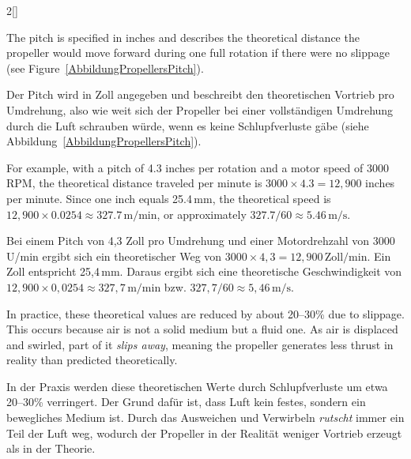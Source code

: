 \begin{paracol}{2}[]
\coleng

The pitch is specified in inches and describes the theoretical distance the propeller would move forward during one full rotation if there were no slippage (see Figure~\ref{AbbildungPropellersPitch}).

\colger

Der Pitch wird in Zoll angegeben und beschreibt den theoretischen Vortrieb pro Umdrehung, also wie weit sich der Propeller bei einer vollständigen Umdrehung durch die Luft schrauben würde, wenn es keine Schlupfverluste gäbe (siehe Abbildung~\ref{AbbildungPropellersPitch}).

\coleng

For example, with a pitch of 4.3 inches per rotation and a motor speed of 3000\,RPM, the theoretical distance traveled per minute is \(3000 \times 4.3 = 12{,}900\) inches per minute. Since one inch equals 25.4\,mm, the theoretical speed is \(12{,}900 \times 0.0254 \approx 327.7\,\text{m/min}\), or approximately \(327.7 / 60 \approx 5.46\,\text{m/s}\).

\colger

Bei einem Pitch von 4,3 Zoll pro Umdrehung und einer Motordrehzahl von 3000\,U/min ergibt sich ein theoretischer Weg von \(3000 \times 4{,}3 = 12{,}900\,\text{Zoll/min}\). Ein Zoll entspricht 25,4\,mm. Daraus ergibt sich eine theoretische Geschwindigkeit von \(12{,}900 \times 0{,}0254 \approx 327{,}7\,\text{m/min}\) bzw. \(327{,}7 / 60 \approx 5{,}46\,\text{m/s}\).

\coleng

In practice, these theoretical values are reduced by about 20--30\% due to slippage. This occurs because air is not a solid medium but a fluid one. As air is displaced and swirled, part of it \textsl{slips away}, meaning the propeller generates less thrust in reality than predicted theoretically.

\colger

In der Praxis werden diese theoretischen Werte durch Schlupfverluste um etwa 20--30\% verringert. Der Grund dafür ist, dass Luft kein festes, sondern ein bewegliches Medium ist. Durch das Ausweichen und Verwirbeln \textsl{rutscht} immer ein Teil der Luft weg, wodurch der Propeller in der Realität weniger Vortrieb erzeugt als in der Theorie.

\colende


\end{paracol}
